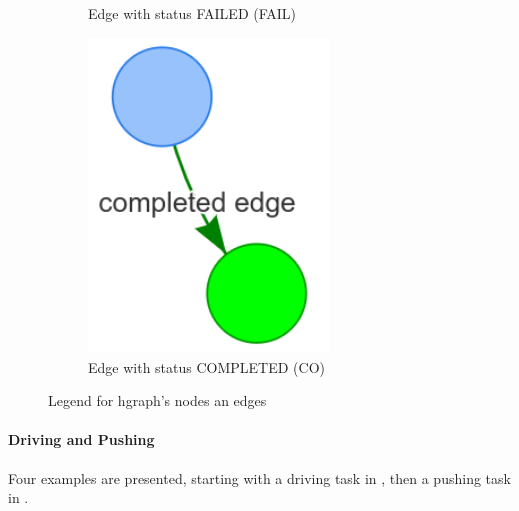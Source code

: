 \begin{figure}[H]
\begin{subfigure}{0.33\textwidth}
    \caption{Edge with status FAILED (FAIL)}%
    \end{subfigure}
    \begin{subfigure}{0.33\textwidth}
    \centering
    \includegraphics[width=0.7\textwidth]{figures/proposed_method/connecting_nodes/legend/completed_edge}
    \caption{Edge with status COMPLETED (CO)}%
    \end{subfigure}
    \caption{Legend for \ac{hgraph}'s nodes an edges}%
    \label{fig:hgraph_legend}
\end{figure}

\paragraph{Driving and Pushing} Four examples are presented, starting with a driving task in , then a pushing task in .\bs

